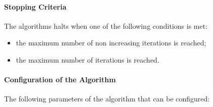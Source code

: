 \documentclass{article}
\begin{document}
\paragraph{Stopping Criteria}
The algorithms halts when one of the following conditions is met:
\begin{itemize}
    \item the maximum number of non increasing iterations is reached;
    \item the maximum number of iterations is reached.
\end{itemize}

\paragraph{Configuration of the Algorithm}
The following parameters of the algorithm that can be configured:
\end{document}
